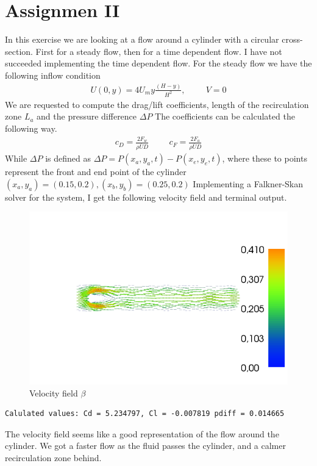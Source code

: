 \documentclass[a4paper,norsk]{article}
\begin{document}
\newpage
\section{Assignmen II}
In this exercise we are looking at a flow around a cylinder with a circular cross-section. First for a steady flow, then for a time 
dependent flow. I have not succeeded implementing the time dependent flow. \newline
For the steady flow we have the following inflow condition
\begin{align*}
U(0,y) = 4U_my\frac{(H-y)}{H^2}, \hspace{1cm} V = 0
\end{align*}
We are requested to compute the drag/lift coefficients, length of the recirculation zone $L_a$ and the pressure difference $\Delta P$
The coefficients can be calculated the following way.
\begin{align*}
c_D = \frac{2F_w}{\rho \overline{U} D} \hspace{1cm} c_F = \frac{2F_a}{\rho \overline{U} D}
\end{align*}
While $\Delta P$ is defined as $\Delta P = P(x_a,y_a,t) - P(x_e,y_e,t)$, where these to points represent the front and end point of the
cylinder $(x_a,y_a) = (0.15,0.2), (x_b,y_b) = (0.25,0.2) $
Implementing a Falkner-Skan solver for the system, I get the following velocity field and terminal output.
\begin{figure}[h!]	
	\centering
	\caption*{Velocity field $\beta$ }
	\includegraphics[scale = 0.6]{mand2/velocity.png}
\end{figure}
\begin{lstlisting}[style=terminal]
Calulated values: Cd = 5.234797, Cl = -0.007819 pdiff = 0.014665
\end{lstlisting}
The velocity field seems like a good representation of the flow around the cylinder. We got a faster flow as the fluid passes
the cylinder, and a calmer recirculation zone behind. 
\end{document}
